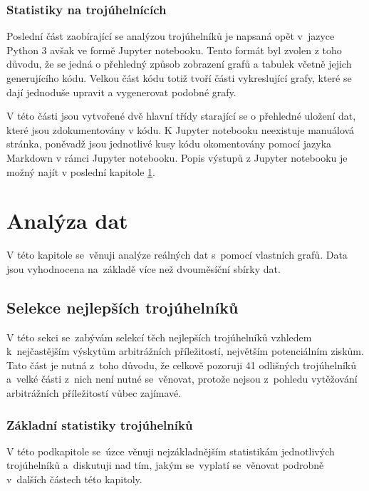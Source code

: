 \documentclass[thesis=B,czech]{FITthesis}[2019/03/21]
\begin{document}
\subsection{Statistiky na trojúhelnících}
\label{subsection:statistics}
Poslední část zaobírající se analýzou trojúhelníků je napsaná opět v~jazyce Python 3 avšak ve formě Jupyter notebooku. Tento formát byl zvolen z toho důvodu, že se jedná o přehledný způsob zobrazení grafů a tabulek včetně jejich generujícího kódu. Velkou část kódu totiž tvoří části vykreslující grafy, které se dají jednoduše upravit a vygenerovat podobné grafy.

V této části jsou vytvořené dvě hlavní třídy starající se o přehledné uložení dat, které jsou zdokumentovány v kódu. K Jupyter notebooku neexistuje manuálová stránka, poněvadž jsou jednotlivé kusy kódu okomentovány pomocí jazyka Markdown v rámci Jupyter notebooku. Popis výstupů z Jupyter notebooku je možný najít v poslední kapitole \ref{chapter:analyza_dat}.



\chapter{Analýza dat}
\label{chapter:analyza_dat}
V této kapitole se~věnuji analýze  reálných dat s~pomocí vlastních grafů. Data jsou vyhodnocena na~základě více než dvouměsíční sbírky dat.

\section{Selekce nejlepších trojúhelníků}
V této sekci se~zabývám selekcí těch nejlepších trojúhelníků vzhledem \linebreak k~nejčastějším výskytům arbitrážních příležitostí, největším potenciálním \linebreak ziskům. Tato část je nutná z~toho důvodu, že celkově pozoruji 41 odlišných trojúhelníků a~velké části z~nich není nutné se~věnovat, protože nejsou z~pohledu vytěžování arbitrážních příležitostí vůbec zajímavé.

\subsection{Základní statistiky trojúhelníků}
V této podkapitole se~úzce věnuji nejzákladnějším statistikám jednotlivých trojúhelníků a~diskutuji nad tím, jakým se~vyplatí se~věnovat podrobně \linebreak v~dalších částech této kapitoly.
\end{document}
